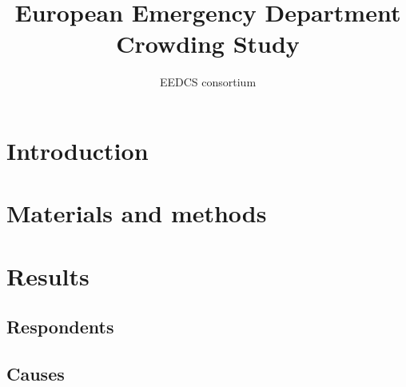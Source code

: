 \documentclass{article}
\title{European Emergency Department Crowding Study}
\author{EEDCS consortium}
\begin{document}
\maketitle

\begin{abstract}
    \lipsum[1]    
\end{abstract}

\section{Introduction}
\lipsum[1-8]
\section{Materials and methods}
\lipsum[9-12]
\section{Results}


\subsection{Respondents}
\lipsum[4-6]
% 
% 



\subsection{Causes}
\lipsum[4-6]
\end{document}
